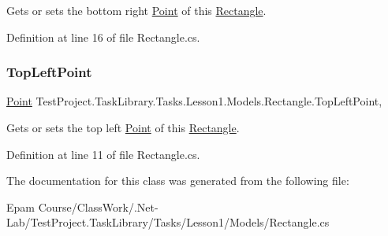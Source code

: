 Gets or sets the bottom right \mbox{\hyperlink{class_test_project_1_1_task_library_1_1_tasks_1_1_lesson1_1_1_models_1_1_point}{Point}} of this \mbox{\hyperlink{class_test_project_1_1_task_library_1_1_tasks_1_1_lesson1_1_1_models_1_1_rectangle}{Rectangle}}. 



Definition at line 16 of file Rectangle.\+cs.

\mbox{\label{class_test_project_1_1_task_library_1_1_tasks_1_1_lesson1_1_1_models_1_1_rectangle_a84a6354c9a96f2d44a9787fd2138cd58}} 
\subsubsection{\texorpdfstring{TopLeftPoint}{TopLeftPoint}}
{\footnotesize\ttfamily \mbox{\hyperlink{class_test_project_1_1_task_library_1_1_tasks_1_1_lesson1_1_1_models_1_1_point}{Point}} Test\+Project.\+Task\+Library.\+Tasks.\+Lesson1.\+Models.\+Rectangle.\+Top\+Left\+Point\hspace{0.3cm}{\ttfamily [get]}, {\ttfamily [set]}}



Gets or sets the top left \mbox{\hyperlink{class_test_project_1_1_task_library_1_1_tasks_1_1_lesson1_1_1_models_1_1_point}{Point}} of this \mbox{\hyperlink{class_test_project_1_1_task_library_1_1_tasks_1_1_lesson1_1_1_models_1_1_rectangle}{Rectangle}}. 



Definition at line 11 of file Rectangle.\+cs.



The documentation for this class was generated from the following file\+:\begin{DoxyCompactItemize}
\item 
Epam Course/\+Class\+Work/.\+Net-\/\+Lab/\+Test\+Project.\+Task\+Library/\+Tasks/\+Lesson1/\+Models/Rectangle.\+cs\end{DoxyCompactItemize}
